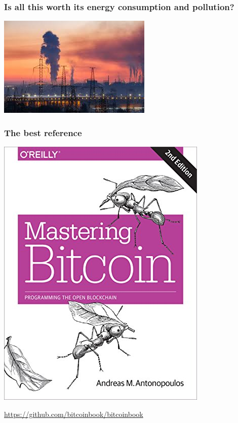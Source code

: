 \documentclass[11pt]{beamer}  %
\begin{document}
\begin{frame}\frametitle{Is all this worth its energy consumption and pollution?}

  \begin{center}
    \includegraphics[scale=1, clip=false]{pictures/pollution.jpg}
  \end{center}

\end{frame}

\begin{frame}\frametitle{The best reference}

  \begin{center}
    \includegraphics[scale=.35,clip=false]{pictures/mastering-bitcoin.jpg}
  \end{center}

  \begin{center}
    \url{https://github.com/bitcoinbook/bitcoinbook}
  \end{center}

\end{frame}
\end{document}
